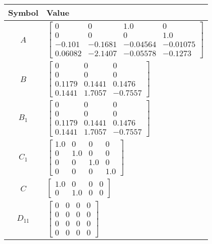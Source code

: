 \begin{tabular}{cl}
\hline
  Symbol  & Value                                                                                                                                                     \\
\hline
   $A$    & $\left[\begin{matrix}0 & 0 & 1.0 & 0\\0 & 0 & 0 & 1.0\\-0.101 & -0.1681 & -0.04564 & -0.01075\\0.06082 & -2.1407 & -0.05578 & -0.1273\end{matrix}\right]$ \\
   $B$    & $\left[\begin{matrix}0 & 0 & 0\\0 & 0 & 0\\0.1179 & 0.1441 & 0.1476\\0.1441 & 1.7057 & -0.7557\end{matrix}\right]$                                        \\
 $B_{1}$  & $\left[\begin{matrix}0 & 0 & 0\\0 & 0 & 0\\0.1179 & 0.1441 & 0.1476\\0.1441 & 1.7057 & -0.7557\end{matrix}\right]$                                        \\
 $C_{1}$  & $\left[\begin{matrix}1.0 & 0 & 0 & 0\\0 & 1.0 & 0 & 0\\0 & 0 & 1.0 & 0\\0 & 0 & 0 & 1.0\end{matrix}\right]$                                               \\
   $C$    & $\left[\begin{matrix}1.0 & 0 & 0 & 0\\0 & 1.0 & 0 & 0\end{matrix}\right]$                                                                                 \\
 $D_{11}$ & $\left[\begin{matrix}0 & 0 & 0 & 0\\0 & 0 & 0 & 0\\0 & 0 & 0 & 0\\0 & 0 & 0 & 0\end{matrix}\right]$                                                       \\

\end{tabular}

